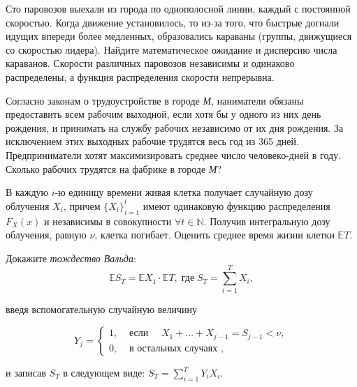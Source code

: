 \begin{problem}
Сто паровозов выехали из города по однополосной линии, каждый с постоянной скоростью. Когда движение установилось, то из-за того, что быстрые догнали идущих впереди более медленных, образовались караваны (группы, движущиеся со скоростью лидера). Найдите математическое ожидание и дисперсию числа караванов. Скорости различных паровозов независимы и одинаково распределены, а функция распределения скорости непрерывна.
\end{problem}

\begin{problem}
Согласно законам о трудоустройстве в городе \textit{М}, наниматели обязаны предоставить всем рабочим выходной, если хотя бы у одного из них день рождения, и принимать на службу рабочих независимо от их дня рождения. За исключением этих выходных рабочие трудятся весь год из 365 дней. Предприниматели хотят максимизировать среднее число человеко-дней в году. Сколько рабочих трудятся на фабрике в городе \textit{М}?

\end{problem}

\begin{problem}
В каждую $i$-ю единицу времени живая клетка получает случайную дозу облучения $X_i$, причем $\{ X_i\}_{i=1}^{t}$ имеют 
одинаковую функцию распределения $F_X(x)$ и независимы в совокупности $\forall t \in \mathbb{N}$. Получив интегральную дозу облучения, 
равную $\nu$, клетка погибает. Оценить среднее время жизни клетки ${\mathbb E}T$. 
\end{problem}

\begin{ordre}

Докажите \textit{тождество Вальда}: 
$$
{\mathbb E}S_T={\mathbb E}X_1\cdot {\mathbb E}T, \; \text{где} \; S_T = \sum_{i=1}^{T}X_i,    
$$

\noindent введя вспомогательную случайную величину

$$
Y_j=\begin{cases}
1, &\text{ если }\quad X_1+\ldots +X_{j-1}=S_{j-1}<\nu, \\
0, &\text{ в остальных случаях }, 
\end{cases}
$$
 
\noindent и записав $S_{T}$ в следующем виде: $S_T = \sum_{i=1}^T Y_i X_i$. 

\end{ordre}

